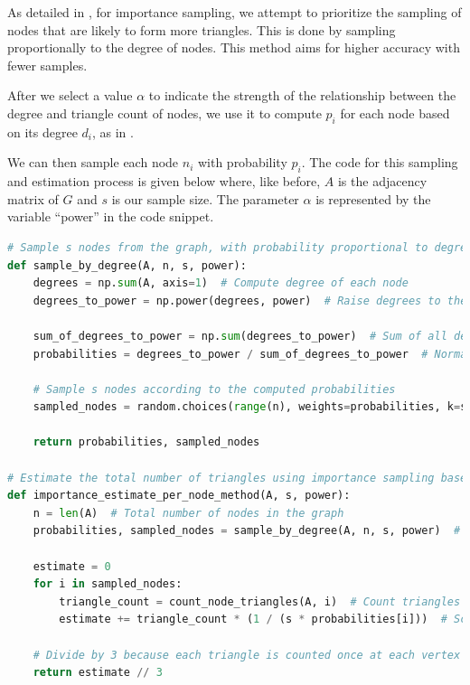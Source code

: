 \documentclass[11pt, margin=1in]{article}
\begin{document}
As detailed in , for importance sampling, we attempt to prioritize the sampling of nodes that are likely to form more triangles.
This is done by sampling proportionally to the degree of nodes.
This method aims for higher accuracy with fewer samples.

After we select a value $\alpha$ to indicate the strength of the relationship between the degree and triangle count of nodes, we use it to compute $p_i$ for each node based on its degree $d_i$, as in .

We can then sample each node $n_i$ with probability $p_i$.
The code for this sampling and estimation process is given below where, like before, $A$ is the adjacency matrix of $G$ and $s$ is our sample size.
The parameter $\alpha$ is represented by the variable ``power'' in the code snippet.

{
\singlespacing
\begin{lstlisting}[language=Python]
# Sample s nodes from the graph, with probability proportional to degree^power
def sample_by_degree(A, n, s, power):
    degrees = np.sum(A, axis=1)  # Compute degree of each node
    degrees_to_power = np.power(degrees, power)  # Raise degrees to the given power

    sum_of_degrees_to_power = np.sum(degrees_to_power)  # Sum of all degrees^power
    probabilities = degrees_to_power / sum_of_degrees_to_power  # Normalize to get probabilities

    # Sample s nodes according to the computed probabilities
    sampled_nodes = random.choices(range(n), weights=probabilities, k=s)

    return probabilities, sampled_nodes

# Estimate the total number of triangles using importance sampling based on degree
def importance_estimate_per_node_method(A, s, power):
    n = len(A)  # Total number of nodes in the graph
    probabilities, sampled_nodes = sample_by_degree(A, n, s, power)  # Sample nodes with importance weights

    estimate = 0
    for i in sampled_nodes:
        triangle_count = count_node_triangles(A, i)  # Count triangles involving node i
        estimate += triangle_count * (1 / (s * probabilities[i]))  # Scale by inverse sampling probability

    # Divide by 3 because each triangle is counted once at each vertex
    return estimate // 3
\end{lstlisting}
}
\end{document}

